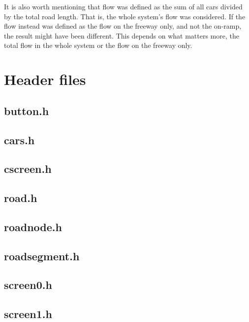 \documentclass{article}
\begin{document}
    It is also worth mentioning that flow was defined as the sum of all cars divided
    by the total road length. That is, the whole system's flow was considered.
    If the flow instead was defined as the flow on the freeway only, and not the
    on-ramp, the result might have been different. This depends on what matters more,
    the total flow in the whole system or the flow on the freeway only.
\printbibliography
\pagebreak
\appendix

\section{Header files}
  \subsection{button.h}
    
  \subsection{cars.h}
    
  \subsection{cscreen.h}
    
  \subsection{road.h}
    
  \subsection{roadnode.h}
    
  \subsection{roadsegment.h}
    
  \subsection{screen0.h}
    
  \subsection{screen1.h}
    
\end{document}
